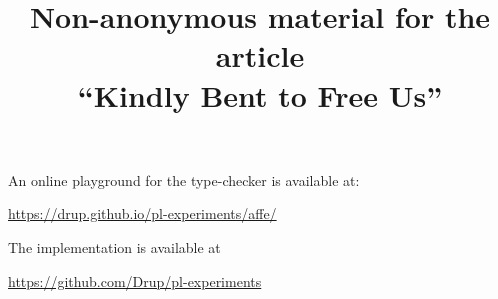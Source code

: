\documentclass{article}
\title{Non-anonymous material for the article\\
  ``Kindly Bent to Free Us''}
\date{}
\begin{document}
\maketitle

An online playground for the type-checker is available at:
\begin{center}
  \url{https://drup.github.io/pl-experiments/affe/}
\end{center}

The implementation is available at
\begin{center}
  \url{https://github.com/Drup/pl-experiments}
\end{center}
\end{document}

